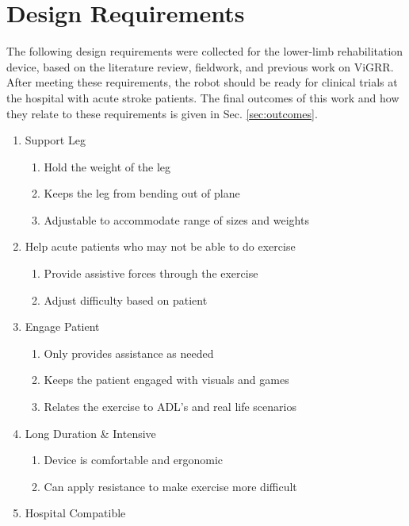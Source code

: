 \documentclass[12pt]{report}
\begin{document}
\section{Design Requirements} \label{sec:requirements} 

The following design requirements were collected for the lower-limb rehabilitation device, based on the literature review, fieldwork, and previous work on ViGRR. After meeting these requirements, the robot should be ready for clinical trials at the hospital with acute stroke patients. The final outcomes of this work and how they relate to these requirements is given in Sec. \ref{sec:outcomes}.

\begin{enumerate}[label*=\arabic*.]
	\item Support Leg
	\begin{enumerate}[label*=\arabic*.]
		\item Hold the weight of the leg
		\item Keeps the leg from bending out of plane 
		\item Adjustable to accommodate range of sizes and weights 
	\end{enumerate}
	\item Help acute patients who may not be able to do exercise
	\begin{enumerate}[label*=\arabic*.]
		\item Provide assistive forces through the exercise
		\item Adjust difficulty based on patient 
	\end{enumerate}
	\item Engage Patient
	\begin{enumerate}[label*=\arabic*.]
		\item Only provides assistance as needed
		\item Keeps the patient engaged with visuals and games
		\item Relates the exercise to ADL's and real life scenarios
	\end{enumerate}
	\item Long Duration \& Intensive
	\begin{enumerate}[label*=\arabic*.]
		\item Device is comfortable and ergonomic
		\item Can apply resistance to make exercise more difficult
	\end{enumerate}
	\item Hospital Compatible
	\begin{enumerate}[label*=\arabic*.]

\end{enumerate}
\end{enumerate}
\end{document}
